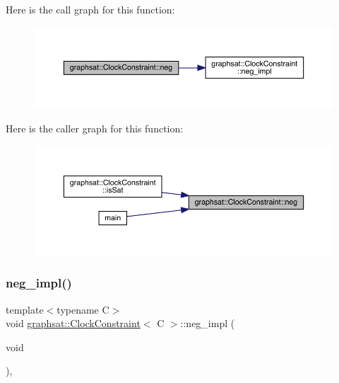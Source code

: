 Here is the call graph for this function\+:\nopagebreak
\begin{figure}[H]
\begin{center}
\leavevmode
\includegraphics[width=350pt]{classgraphsat_1_1_clock_constraint_a561831532370518c82b43f6e8a3a5c9e_cgraph}
\end{center}
\end{figure}
Here is the caller graph for this function\+:
\nopagebreak
\begin{figure}[H]
\begin{center}
\leavevmode
\includegraphics[width=350pt]{classgraphsat_1_1_clock_constraint_a561831532370518c82b43f6e8a3a5c9e_icgraph}
\end{center}
\end{figure}
\mbox{\label{classgraphsat_1_1_clock_constraint_a5217585f904187d8cf0880e6dd1838b0}} 
\subsubsection{\texorpdfstring{neg\_impl()}{neg\_impl()}}
{\footnotesize\ttfamily template$<$typename C$>$ \\
void \mbox{\hyperlink{classgraphsat_1_1_clock_constraint}{graphsat\+::\+Clock\+Constraint}}$<$ C $>$\+::neg\+\_\+impl (\begin{DoxyParamCaption}\item[{void}]{ }\end{DoxyParamCaption})\hspace{0.3cm}{\ttfamily [inline]}, {\ttfamily [private]}}

